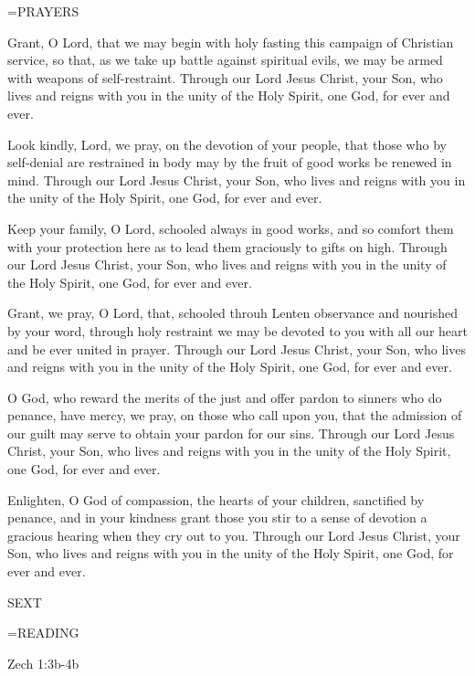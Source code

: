 \hangindent=\parindent \small PRAYERS
\begin{description}[labelindent=\parindent, leftmargin=*]
\item [Ash Wednesday:] 	Grant, O Lord, that we may begin with holy fasting this campaign of Christian service, so that, as we take up battle against spiritual evils, we may be armed with weapons of self-restraint. Through our Lord Jesus Christ, your Son, who lives and reigns with you in the unity of the Holy Spirit, one God, for ever and ever.
\item [Week 1:] 	Look kindly, Lord, we pray, on the devotion of your people, that those who by self-denial are restrained in body may by the fruit of good works be renewed in mind. Through our Lord Jesus Christ, your Son, who lives and reigns with you in the unity of the Holy Spirit, one God, for ever and ever.
\item [Week 2:] 	Keep your family, O Lord, schooled always in good works, and so comfort them with your protection here as to lead them graciously to gifts on high. Through our Lord Jesus Christ, your Son, who lives and reigns with you in the unity of the Holy Spirit, one God, for ever and ever.
\item [Week 3:] 	Grant, we pray, O Lord, that, schooled throuh Lenten observance and nourished by your word, through holy restraint we may be devoted to you with all our heart and be ever united in prayer. Through our Lord Jesus Christ, your Son, who lives and reigns with you in the unity of the Holy Spirit, one God, for ever and ever.
\item [Week 4:] 	O God, who reward the merits of the just and offer pardon to sinners who do penance, have mercy, we pray, on those who call upon you, that the admission of our guilt may serve to obtain your pardon for our sins. Through our Lord Jesus Christ, your Son, who lives and reigns with you in the unity of the Holy Spirit, one God, for ever and ever.
\item [Week 5:] 	Enlighten, O God of compassion, the hearts of your children, sanctified by penance, and in your kindness grant those you stir to a sense of devotion a gracious hearing when they cry out to you. Through our Lord Jesus Christ, your Son, who lives and reigns with you in the unity of the Holy Spirit, one God, for ever and ever.
\end{description}

\begin{flushleft}\normalsize SEXT\\\end{flushleft}
\hangindent=\parindent \small READING
\begin{description}[labelindent=\parindent, leftmargin=*]
\item [Ash Wednesday \& Weeks 1-4:]     Zech 1:3b-4b \textbf{    \\}
\end{description}

